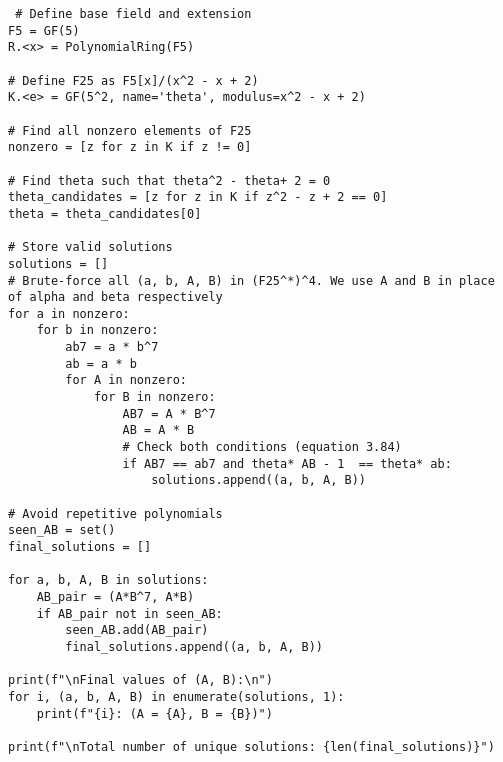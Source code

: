 \documentclass[12pt,a4wide, reqno]{amsart}
\theoremstyle{definition}
\theoremstyle{remark}
\numberwithin{equation}{section}
\begin{document}
 \begin{lstlisting}
 # Define base field and extension
F5 = GF(5)
R.<x> = PolynomialRing(F5)

# Define F25 as F5[x]/(x^2 - x + 2)
K.<e> = GF(5^2, name='theta', modulus=x^2 - x + 2)

# Find all nonzero elements of F25
nonzero = [z for z in K if z != 0]

# Find theta such that theta^2 - theta+ 2 = 0
theta_candidates = [z for z in K if z^2 - z + 2 == 0]
theta = theta_candidates[0]

# Store valid solutions
solutions = []
# Brute-force all (a, b, A, B) in (F25^*)^4. We use A and B in place of alpha and beta respectively
for a in nonzero:
    for b in nonzero:
        ab7 = a * b^7
        ab = a * b
        for A in nonzero:
            for B in nonzero:
                AB7 = A * B^7
                AB = A * B
                # Check both conditions (equation 3.84)
                if AB7 == ab7 and theta* AB - 1  == theta* ab:
                    solutions.append((a, b, A, B))
                    
# Avoid repetitive polynomials                  
seen_AB = set()
final_solutions = []

for a, b, A, B in solutions:
    AB_pair = (A*B^7, A*B)
    if AB_pair not in seen_AB:
        seen_AB.add(AB_pair)
        final_solutions.append((a, b, A, B))
        
print(f"\nFinal values of (A, B):\n")
for i, (a, b, A, B) in enumerate(solutions, 1):
    print(f"{i}: (A = {A}, B = {B})")

print(f"\nTotal number of unique solutions: {len(final_solutions)}")
 \end{lstlisting}
\end{document}

